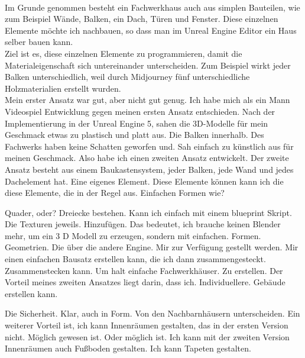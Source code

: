 \documentclass[10pt,a4paper,bibliography=totocnumbered,listof=totocnumbered]{scrartcl}
\begin{document}
\\
Im Grunde genommen besteht ein Fachwerkhaus auch aus simplen Bauteilen, wie zum Beispiel Wände, Balken, ein Dach, Türen und Fenster. Diese einzelnen Elemente möchte ich nachbauen, so dass man im Unreal Engine Editor ein Haus selber bauen kann.
\\
Ziel ist es, diese einzelnen Elemente zu programmieren, damit die Materialeigenschaft sich untereinander unterscheiden. Zum Beispiel wirkt jeder Balken unterschiedlich, weil durch Midjourney fünf unterschiedliche Holzmaterialien erstellt wurden.
\\
Mein erster Ansatz war gut, aber nicht gut genug. Ich habe mich als ein Mann Videospiel Entwicklung gegen meinen ersten Ansatz entschieden. Nach der Implementierung in der Unreal Engine 5, sahen die 3D-Modelle für mein Geschmack etwas zu plastisch und platt aus. Die Balken innerhalb. Des Fachwerks haben keine Schatten geworfen und.  Sah einfach zu künstlich aus für meinen Geschmack. Also habe ich einen zweiten Ansatz entwickelt. Der zweite Ansatz besteht aus einem Baukastensystem, jeder Balken, jede Wand und jedes Dachelement hat.  Eine eigenes Element.  Diese Elemente können kann ich die diese Elemente, die in der Regel aus. Einfachen Formen wie?
 
Quader, oder? Dreiecke bestehen.  Kann ich einfach mit einem blueprint Skript.  Die Texturen jeweils. Hinzufügen.  Das bedeutet, ich brauche keinen Blender mehr, um ein 3 D Modell zu erzeugen, sondern mit einfachen.  Formen. Geometrien. Die über die andere Engine.   Mir zur Verfügung gestellt werden.  Mir einen einfachen Bausatz erstellen kann, die ich dann zusammengesteckt. Zusammenstecken kann. Um halt einfache Fachwerkhäuser. Zu erstellen.  Der Vorteil meines zweiten Ansatzes liegt darin, dass ich. Individuellere. Gebäude erstellen kann.
 
Die Sicherheit. Klar, auch in Form.  Von den Nachbarnhäusern unterscheiden.  	Ein weiterer Vorteil ist, ich kann Innenräumen gestalten, das in der ersten Version nicht. Möglich gewesen ist. Oder möglich ist.    	Ich kann mit der zweiten Version Innenräumen auch Fußboden gestalten. Ich kann Tapeten gestalten.
 
\end{document}
